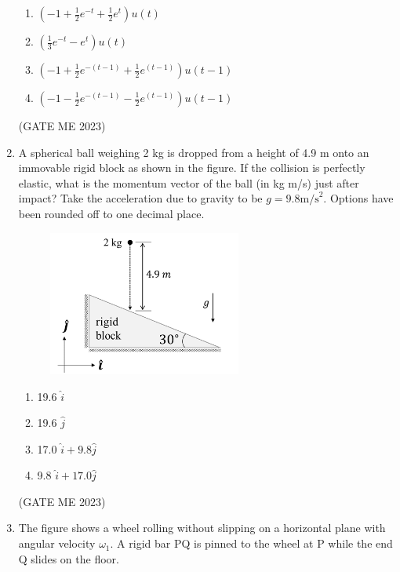 \documentclass[journal]{IEEEtran}
\begin{document}
\begin{enumerate}
\begin{enumerate}
    \item $ \left( -1 + \frac{1}{2} e^{-t} + \frac{1}{2} e^{t} \right) u(t) $
    \item $ \left( \frac{1}{3} e^{-t} - e^{t} \right) u(t) $
    \item $ \left( -1 + \frac{1}{2} e^{-(t-1)} + \frac{1}{2} e^{(t-1)} \right) u(t-1) $
    \item $ \left( -1 - \frac{1}{2} e^{-(t-1)} - \frac{1}{2} e^{(t-1)} \right) u(t-1) $
\end{enumerate}
\hfill (GATE ME 2023)

\item A spherical ball weighing 2 kg is dropped from a height of 4.9 m onto an immovable rigid block as shown in the figure. If the collision is perfectly elastic, what is the momentum vector of the ball (in kg m/s) just after impact? Take the acceleration due to gravity to be $ g = 9.8  \text{m/s}^2 $. Options have been rounded off to one decimal place.
\begin{figure}[H]
\centering
\includegraphics[width=0.6\textwidth]{Fig 29.png}
\caption{}
\label{fig:question37}
\end{figure}

\begin{enumerate}
    \item 19.6 $\hat{i}$
    \item 19.6 $\hat{j}$
    \item 17.0 $\hat{i} + 9.8 \hat{j}$
    \item 9.8 $\hat{i} + 17.0 \hat{j}$
\end{enumerate}
\hfill (GATE ME 2023)

\item The figure shows a wheel rolling without slipping on a horizontal plane with angular velocity $\omega_1$. A rigid bar PQ is pinned to the wheel at P while the end Q slides on the floor. 


\end{enumerate}
\end{document}
